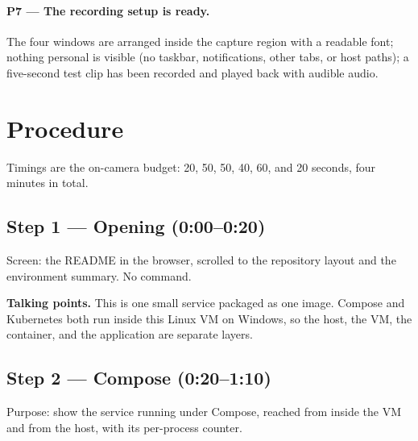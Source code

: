 \documentclass[11pt,letterpaper]{article}
\newcommand{\talk}[1]{\begin{shaded*}\noindent\textbf{Talking points.} #1\end{shaded*}}
\begin{document}
\paragraph{P7 --- The recording setup is ready.} The four windows are arranged inside the capture region with a readable font; nothing personal is visible (no taskbar, notifications, other tabs, or host paths); a five-second test clip has been recorded and played back with audible audio.

\section{Procedure}

Timings are the on-camera budget: 20, 50, 50, 40, 60, and 20 seconds, four minutes in total.

\subsection*{Step 1 --- Opening (0:00--0:20)}
Screen: the README in the browser, scrolled to the repository layout and the environment summary. No command.
\talk{This is one small service packaged as one image. Compose and Kubernetes both run inside this Linux VM on Windows, so the host, the VM, the container, and the application are separate layers.}

\subsection*{Step 2 --- Compose (0:20--1:10)}
Purpose: show the service running under Compose, reached from inside the VM and from the host, with its per-process counter.
\end{document}
